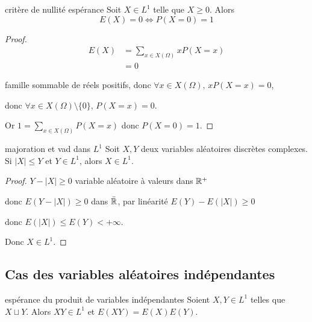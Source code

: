 \begin{proposition}{critère de nullité espérance}{}
    Soit $X \in L^1$ telle que $X \geqslant 0$. Alors 
    $$ E(X) = 0 \iff P(X = 0) = 1 $$
    
\end{proposition}

\begin{proof}
    \begin{align}
        E(X) & = \sum_{x \in X(\Omega)} x P(X = x) \\
        & = 0
    \end{align}

    famille sommable de réels positifs, donc $\forall x \in X(\Omega), \, x P(X = x) = 0$, 

    donc $\forall x \in X(\Omega) \setminus \{0\}, \, P(X = x) = 0$.

    Or $\displaystyle 1 = \sum_{x \in X(\Omega)} P(X = x)$ donc $P(X = 0) = 1$.
\end{proof}

\begin{proposition}{majoration et vad dans $L^1$}{}
    Soit $X, Y$ deux variables aléatoires discrètes complexes. Si 
    $|X| \leqslant Y$ et $Y \in L^1$, alors $X \in L^1$.
\end{proposition}


\begin{proof}
    $Y - |X| \geqslant 0$ variable aléatoire à valeurs dans $\mathbb{R}^+$ 
    
    donc $E(Y - |X|) \geqslant 0$ dans $\bar {\mathbb{R}}$, par linéarité $E(Y) - E(|X|) \geqslant 0$

    donc $E(|X|) \leqslant E(Y) < + \infty$.

    Donc $X \in L^1$.
\end{proof}

\subsection{Cas des variables aléatoires indépendantes }

\begin{theoreme}{espérance du produit de variables indépendantes}{}
    Soient $X, Y \in L^1$ telles que $X \sqcup Y$. Alors 
    $XY \in L^1$ et $E(XY) = E(X) E(Y)$.
\end{theoreme}


